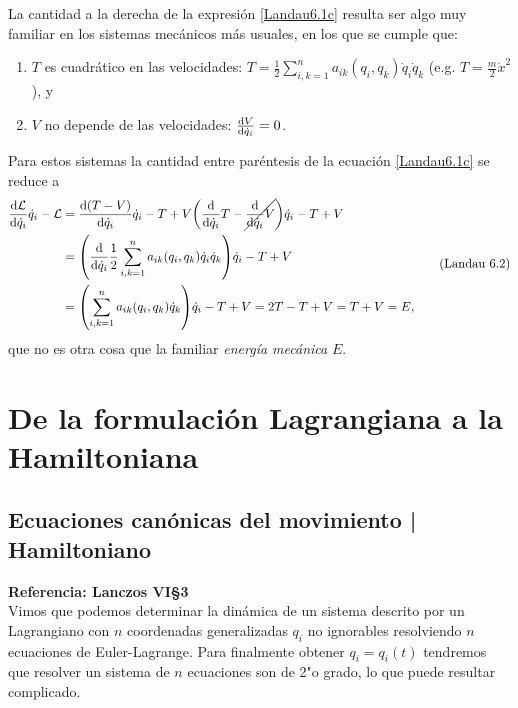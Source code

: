 \documentclass[12pt, spanish, a4paper, ]{article}
\begin{document}
La cantidad a la derecha de la expresión \eqref{Landau6.1c} resulta ser algo muy familiar en los sistemas mecánicos más usuales, en los que se cumple que:
\begin{enumerate}
	\item \(T\) es cuadrático en las velocidades: \(T= \frac{1}{2} \displaystyle\sum_{i,k=1}^n a_{ik}(q_i, q_k) \dot{q}_i \dot{q}_k\) (e.g. \(T= \frac{m}{2} \dot{x}^2\)), y
	\item \(V\) no depende de las velocidades: \(\dv{V}{\dot{q}_i}=0\).%
\end{enumerate}
Para estos sistemas la cantidad entre paréntesis de la ecuación \eqref{Landau6.1c} se reduce a
\begin{equation}\label{unsereLandau6.2}
	\begin{aligned}
		\dv{\mathcal{L}}{\dot{q}_i} \dot{q}_i - \mathcal{L} &=
		\dv{\pqty{T-V}}{\dot{q}_i} \dot{q}_i - T+ V
		\pqty{\dv{\dot{q}_i} T - \cancel{\dv{\dot{q}_i} V}} \dot{q}_i - T+ V \\
		& = \pqty{\dv{\dot{q}_i} \frac{1}{2} \displaystyle\sum_{i,k=1}^n a_{ik}(q_i, q_k) \dot{q}_i \dot{q}_k } \dot{q}_i - T+ V \\
		& = \pqty{ \displaystyle\sum_{i,k=1}^n a_{ik}(q_i, q_k) \dot{q}_k } \dot{q}_i - T+ V = 2 T - T + V = T+ V = E,
	\end{aligned}
	\tag{Landau 6.2}
\end{equation}
que no es otra cosa que la familiar \emph{energía mecánica} \(E\).


\section{De la formulación Lagrangiana a la Hamiltoniana}

\subsection{Ecuaciones canónicas del movimiento | Hamiltoniano} %
\textbf{Referencia: Lanczos VI\S3}\\

Vimos que podemos determinar la dinámica de un sistema descrito por un Lagrangiano con \(n\) coordenadas generalizadas \(q_i\) no ignorables resolviendo \(n\) ecuaciones de Euler-Lagrange.
Para finalmente obtener \(q_i= q_i(t)\) tendremos que resolver un sistema de \(n\) ecuaciones son de 2"o grado, lo que puede resultar complicado.
\end{document}
